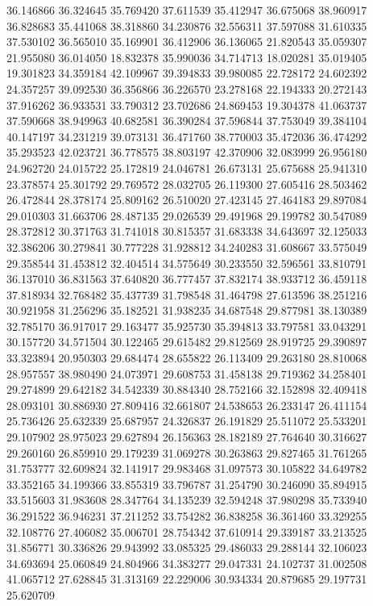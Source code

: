 36.146866
36.324645
35.769420
37.611539
35.412947
36.675068
38.960917
36.828683
35.441068
38.318860
34.230876
32.556311
37.597088
31.610335
37.530102
36.565010
35.169901
36.412906
36.136065
21.820543
35.059307
21.955080
36.014050
18.832378
35.990036
34.714713
18.020281
35.019405
19.301823
34.359184
42.109967
39.394833
39.980085
22.728172
24.602392
24.357257
39.092530
36.356866
36.226570
23.278168
22.194333
20.272143
37.916262
36.933531
33.790312
23.702686
24.869453
19.304378
41.063737
37.590668
38.949963
40.682581
36.390284
37.596844
37.753049
39.384104
40.147197
34.231219
39.073131
36.471760
38.770003
35.472036
36.474292
35.293523
42.023721
36.778575
38.803197
42.370906
32.083999
26.956180
24.962720
24.015722
25.172819
24.046781
26.673131
25.675688
25.941310
23.378574
25.301792
29.769572
28.032705
26.119300
27.605416
28.503462
26.472844
28.378174
25.809162
26.510020
27.423145
27.464183
29.897084
29.010303
31.663706
28.487135
29.026539
29.491968
29.199782
30.547089
28.372812
30.371763
31.741018
30.815357
31.683338
34.643697
32.125033
32.386206
30.279841
30.777228
31.928812
34.240283
31.608667
33.575049
29.358544
31.453812
32.404514
34.575649
30.233550
32.596561
33.810791
36.137010
36.831563
37.640820
36.777457
37.832174
38.933712
36.459118
37.818934
32.768482
35.437739
31.798548
31.464798
27.613596
38.251216
30.921958
31.256296
35.182521
31.938235
34.687548
29.877981
38.130389
32.785170
36.917017
29.163477
35.925730
35.394813
33.797581
33.043291
30.157720
34.571504
30.122465
29.615482
29.812569
28.919725
29.390897
33.323894
20.950303
29.684474
28.655822
26.113409
29.263180
28.810068
28.957557
38.980490
24.073971
29.608753
31.458138
29.719362
34.258401
29.274899
29.642182
34.542339
30.884340
28.752166
32.152898
32.409418
28.093101
30.886930
27.809416
32.661807
24.538653
26.233147
26.411154
25.736426
25.632339
25.687957
24.326837
26.191829
25.511072
25.533201
29.107902
28.975023
29.627894
26.156363
28.182189
27.764640
30.316627
29.260160
26.859910
29.179239
31.069278
30.263863
29.827465
31.761265
31.753777
32.609824
32.141917
29.983468
31.097573
30.105822
34.649782
33.352165
34.199366
33.855319
33.796787
31.254790
30.246090
35.894915
33.515603
31.983608
28.347764
34.135239
32.594248
37.980298
35.733940
36.291522
36.946231
37.211252
33.754282
36.838258
36.361460
33.329255
32.108776
27.406082
35.006701
28.754342
37.610914
29.339187
33.213525
31.856771
30.336826
29.943992
33.085325
29.486033
29.288144
32.106023
34.693694
25.060849
24.804966
34.383277
29.047331
24.102737
31.002508
41.065712
27.628845
31.313169
22.229006
30.934334
20.879685
29.197731
25.620709
